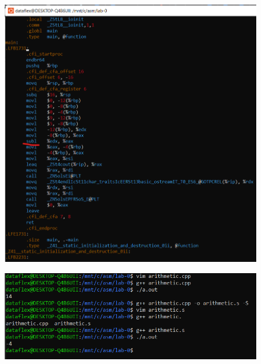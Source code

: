 \documentclass[a4paper,12pt]{article}
\begin{document}
\begin{figure}[h] %
	\centering
	\includegraphics[width=0.8\linewidth]{arithmetic sub.png}
\end{figure}


\begin{figure}[h] %
	\centering
	\includegraphics[width=0.8\linewidth]{arithmetic command line.png}
\end{figure}
\end{document}
